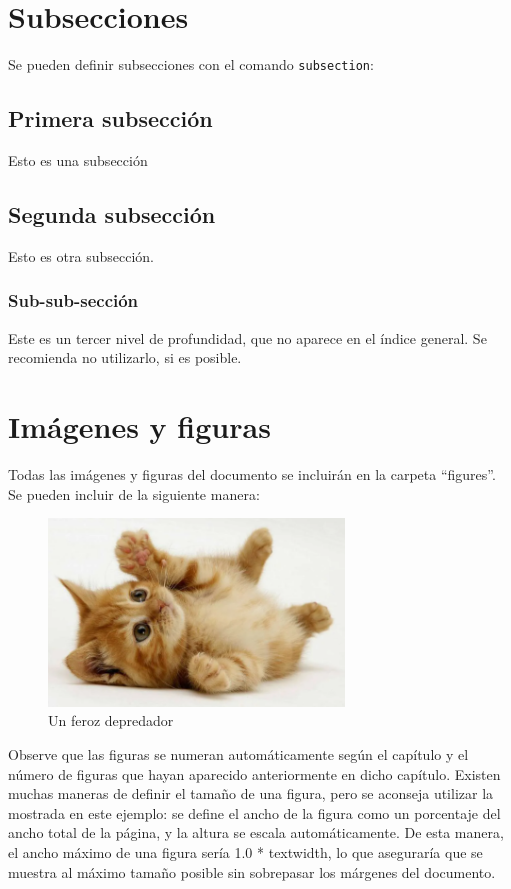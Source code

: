\section{Subsecciones}
Se pueden definir subsecciones con el comando \texttt{subsection}:

\subsection{Primera subsección}\label{sec:subseccion}
Esto es una subsección

\subsection{Segunda subsección}
Esto es otra subsección.

\subsubsection{Sub-sub-sección}
Este es un tercer nivel de profundidad, que no aparece en el índice general. Se recomienda no utilizarlo, si es posible.

\section{Imágenes y figuras}
Todas las imágenes y figuras del documento se incluirán en la carpeta ``figures''. Se pueden incluir de la siguiente manera:

\begin{figure}[htp]
    \centering
    \includegraphics[width=0.7\textwidth]{figures/ejemplo.png}
    \caption{Un feroz depredador}
    \label{fig:ejemplo}
\end{figure}

Observe que las figuras se numeran automáticamente según el capítulo y el número de figuras que hayan aparecido anteriormente en dicho capítulo. Existen muchas maneras de definir el tamaño de una figura, pero se aconseja utilizar la mostrada en este ejemplo: se define el ancho de la figura como un porcentaje del ancho total de la página, y la altura se escala automáticamente. De esta manera, el ancho máximo de una figura sería 1.0 * textwidth, lo que aseguraría que se muestra al máximo tamaño posible sin sobrepasar los márgenes del documento.

